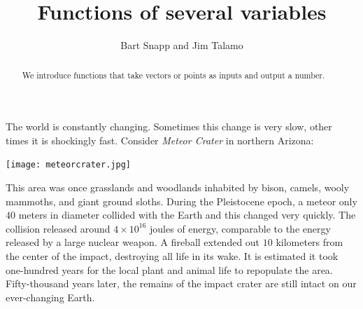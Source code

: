 \documentclass{ximera}
\author{Bart Snapp and Jim Talamo}
\title[Dig-In:]{Functions of several variables}
\begin{document}
\begin{abstract}
  We introduce functions that take vectors or points as inputs and
  output a number.
\end{abstract}
\maketitle

The world is constantly changing. Sometimes this change is very slow,
other times it is shockingly fast. Consider \textit{Meteor Crater} in
northern Arizona:
\begin{image}[3in]
  \texttt{[image: meteorcrater.jpg]}
\end{image}
This area was once grasslands and woodlands inhabited by bison,
camels, wooly mammoths, and giant ground sloths. During the
Pleistocene epoch, a meteor only $40$ meters in diameter collided
with the Earth and this changed very quickly. The collision released
around $4\times10^{16}$ joules of energy, comparable to the energy
released by a large nuclear weapon. A fireball extended out $10$
kilometers from the center of the impact, destroying all life in its
wake. It is estimated it took one-hundred years for the local plant
and animal life to repopulate the area.  Fifty-thousand years later,
the remains of the impact crater are still intact on our ever-changing
Earth.
\end{document}
